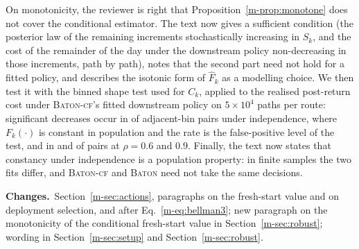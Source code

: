 \documentclass[11pt]{article}
\newcommand{\chg}{\par\noindent\textbf{Changes.}\ }
\newcommand{\sref}[1]{Section~\ref{m-#1}}
\newcommand{\pref}[1]{Proposition~\ref{m-#1}}
\begin{document}
On monotonicity, the reviewer is right that \pref{prop:monotone} does not
cover the conditional estimator. The text now gives a sufficient
condition (the posterior law of the remaining increments stochastically
increasing in $S_k$, and the cost of the remainder of the day under the
downstream policy non-decreasing in those increments, path by path),
notes that the second part need not hold for a fitted policy, and
describes the isotonic form of $\widehat F_k$ as a modelling choice. We
then test it with the binned shape test used for $C_k$, applied to the
realised post-return cost under \textsc{Baton-cf}'s fitted downstream
policy on $5\times10^4$ paths per route: significant decreases occur in
\shapeFZero{} of adjacent-bin pairs under independence, where
$F_k(\cdot)$ is constant in population and the rate is the
false-positive level of the test, and in \shapeFSix{} and \shapeFNine{}
of pairs at $\rho = 0.6$ and $0.9$. Finally, the text now states that
constancy under independence is a population property: in finite
samples the two fits differ, and \textsc{Baton-cf} and \textsc{Baton}
need not take the same decisions.
\chg \sref{sec:actions}, paragraphs on the fresh-start value and on
deployment selection, and after Eq.~\eqref{m-eq:bellman3}; new paragraph
on the monotonicity of the conditional fresh-start value in
\sref{sec:robust}; wording in \sref{sec:setup} and \sref{sec:robust}.
\end{document}
